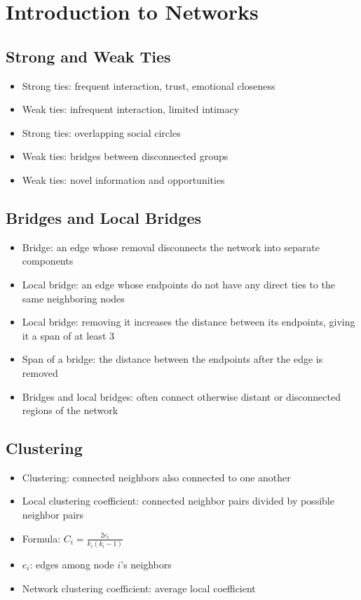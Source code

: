 \chapter{Introduction to Networks}

\section{Strong and Weak Ties}
\begin{itemize}
  \item Strong ties: frequent interaction, trust, emotional closeness
  \item Weak ties: infrequent interaction, limited intimacy
  \item Strong ties: overlapping social circles
  \item Weak ties: bridges between disconnected groups
  \item Weak ties: novel information and opportunities
\end{itemize}

\section{Bridges and Local Bridges}
\begin{itemize}
  \item Bridge: an edge whose removal disconnects the network into separate components
  \item Local bridge: an edge whose endpoints do not have any direct ties to the same neighboring nodes
  \item Local bridge: removing it increases the distance between its endpoints, giving it a span of at least 3
  \item Span of a bridge: the distance between the endpoints after the edge is removed
  \item Bridges and local bridges: often connect otherwise distant or disconnected regions of the network
\end{itemize}

\section{Clustering}
\begin{itemize}
  \item Clustering: connected neighbors also connected to one another
  \item Local clustering coefficient: connected neighbor pairs divided by possible neighbor pairs
  \item Formula: $C_i = \frac{2e_i}{k_i(k_i-1)}$
  \item $e_i$: edges among node $i$'s neighbors
  \item Network clustering coefficient: average local coefficient
\end{itemize}

